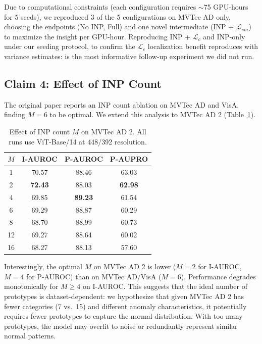 \documentclass[10pt]{article} %
\begin{document}
Due to computational constraints (each configuration requires $\sim$75 GPU-hours for 5 seeds), we reproduced 3 of the 5 configurations on MVTec AD only, choosing the endpoints (No INP, Full) and one novel intermediate (INP + $\mathcal{L}_{sm}$) to maximize the insight per GPU-hour. Reproducing INP + $\mathcal{L}_c$ and INP-only under our seeding protocol, to confirm the $\mathcal{L}_c$ localization benefit reproduces with variance estimates: is the most informative follow-up experiment we did not run.

\subsection{Claim 4: Effect of INP Count}
\label{sec:results_inp_count}

The original paper reports an INP count ablation on MVTec AD and VisA, finding $M=6$ to be optimal. We extend this analysis to MVTec AD 2 (Table~\ref{tab:inp_count}).

\begin{table}[t]
\caption{Effect of INP count $M$ on MVTec AD 2. All runs use ViT-Base/14 at 448/392 resolution.}
\label{tab:inp_count}
\begin{center}
\begin{tabular}{cccc}
\toprule
$M$ & I-AUROC & P-AUROC & P-AUPRO \\
\midrule
1  & 70.57 & 88.46 & 63.03 \\
2  & \textbf{72.43} & 88.03 & \textbf{62.98} \\
4  & 69.85 & \textbf{89.23} & 61.54 \\
6  & 69.29 & 88.87 & 60.29 \\
8  & 68.70 & 88.99 & 60.73 \\
12 & 69.27 & 88.64 & 60.02 \\
16 & 68.27 & 88.13 & 57.60 \\
\bottomrule
\end{tabular}
\end{center}
\end{table}

Interestingly, the optimal $M$ on MVTec AD 2 is lower ($M=2$ for I-AUROC, $M=4$ for P-AUROC) than on MVTec AD/VisA ($M=6$). Performance degrades monotonically for $M \geq 4$ on I-AUROC. This suggests that the ideal number of prototypes is dataset-dependent: we hypothesize that given MVTec AD 2 has fewer categories (7 vs.\ 15) and different anomaly characteristics, it potentially requires fewer prototypes to capture the normal distribution. With too many prototypes, the model may overfit to noise or redundantly represent similar normal patterns.
\end{document}
